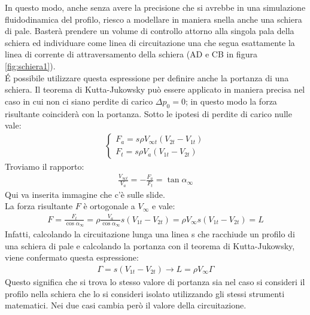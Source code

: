In questo modo, anche senza avere la precisione che si avrebbe in una simulazione fluidodinamica del profilo, riesco a modellare in maniera snella anche una schiera di pale. Basterà prendere un volume di controllo attorno alla singola pala della schiera ed individuare come linea di circuitazione una che segua esattamente la linea di corrente di attraversamento della schiera (AD e CB in figura \ref{fig:schiera1}).\\
\'E possibile utilizzare questa espressione per definire anche la portanza di una schiera. Il teorema di Kutta-Jukowsky può essere applicato in maniera precisa nel caso in cui non ci siano perdite di carico $\Delta p_0=0$; in questo modo la forza risultante coinciderà con la portanza. Sotto le ipotesi di perdite di carico nulle vale:
\begin{align*}
\begin{cases}
F_a = s \rho V_{\infty t} (V_{2t}-V_{1t})\\
F_t = s \rho V_a (V_{1t}-V_{2t})
\end{cases}
\end{align*}
Troviamo il rapporto:
\begin{align*}
	\frac{V_{\infty t}}{V_a}=-\frac{F_a}{F_t} = \tan \alpha_{\infty}
\end{align*}
Qui va inserita immagine che c'è sulle slide.\\
La forza risultante $F$ è ortogonale a $V_\infty$ e vale:
\begin{align*}
F=\frac{F_t}{\cos \alpha_{\infty}}=\rho \frac{V_a}{\cos \alpha_{\infty}}s(V_{1t}-V_{2t})=\rho V_\infty s (V_{1t}-V_{2t})=L
\end{align*}
Infatti, calcolando la circuitazione lunga una linea s che racchiude un profilo di una schiera di pale e calcolando la portanza con il teorema di Kutta-Jukowsky, viene confermato questa espressione:
\begin{align*}
\Gamma=s(V_{1t}-V_{2t}) \rightarrow L=\rho V_\infty \Gamma
\end{align*}
Questo significa che si trova lo stesso valore di portanza sia nel caso si consideri il profilo nella schiera che lo si consideri isolato utilizzando gli stessi strumenti matematici. Nei due casi cambia però il valore della circuitazione.

